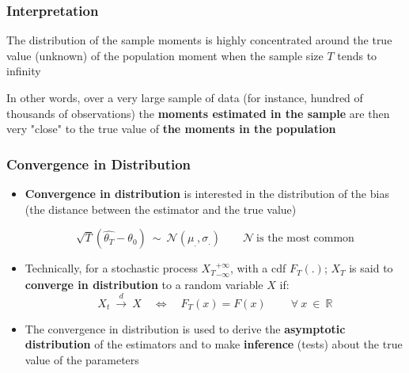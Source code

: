 \documentclass{beamer}
\newenvironment{wideenumerate}{\enumerate\addtolength{\itemsep}{10pt}}{\endenumerate}
\begin{document}
  \begin{frame}
    \frametitle{Interpretation}
    \begin{wideenumerate}
    \item The distribution of the sample moments is highly concentrated around the true value (unknown) of the population moment when the sample size $T$ tends to infinity
    \item In other words, over a very large sample of data (for instance, hundred of thousands of observations) the \textbf{moments estimated in the sample} are then very "close" to the true value of \textbf{the moments in the population}
    \end{wideenumerate}
  \end{frame}
  

  \begin{frame}
    \frametitle{Convergence in Distribution}

    \begin{itemize}
\item  \textbf{Convergence in distribution} is interested in the distribution of the bias (the distance between the estimator and the true value)

  \begin{equation*}
    \sqrt{T} \left(\hat{\theta_T} - \theta_0 \right) \ \sim \ \mathcal{N}(\mu_., \sigma_.) \qquad \mathcal{N} \ \text{is the most common} 
  \end{equation*}

\item Technically, for a stochastic process ${X_T}_{-\infty}^ {+\infty}$, with a cdf $F_T(.)$; $X_T$ is said to \textbf{converge in distribution} to a random variable $X$ if:
  \begin{equation*}
X_t \ \overset{d}{\to} \ X \quad \Leftrightarrow \quad  F_T(x) = F(x) \qquad \ \forall \ x \ \in \ \mathbb{R}
  \end{equation*}
    
\item The convergence in distribution is used to derive the \textbf{asymptotic distribution} of the estimators and to make \textbf{inference} (tests) about the true value of the parameters

    \end{itemize}
    
  \end{frame}
\end{document}
